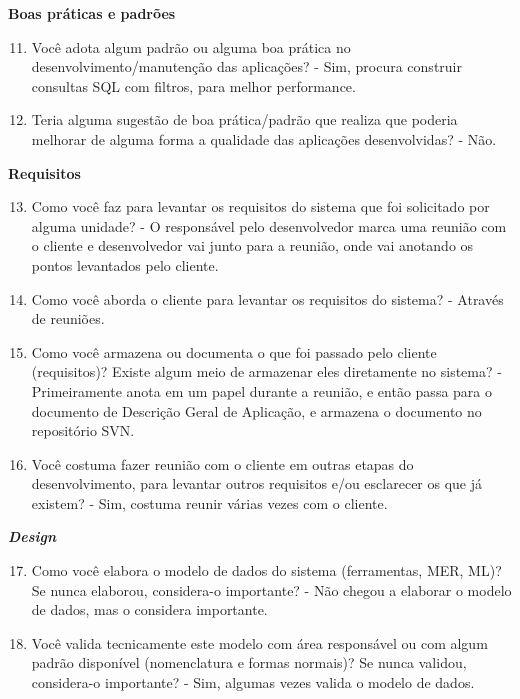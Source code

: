 \begin{anexosenv}
\textbf{Boas práticas e padrões}

\begin{enumerate}
\setcounter{enumi}{10}
\item Você adota algum padrão ou alguma boa prática no desenvolvimento/manutenção das
aplicações?\newline
- Sim, procura construir consultas SQL com filtros, para melhor performance.
\item Teria alguma sugestão de boa prática/padrão que realiza que poderia melhorar de
alguma forma a qualidade das aplicações desenvolvidas?\newline
- Não.
\end{enumerate}

\textbf{Requisitos}

\begin{enumerate}
\setcounter{enumi}{12}
\item Como você faz para levantar os requisitos do sistema que foi solicitado por alguma
unidade?\newline
- O responsável pelo desenvolvedor marca uma reunião com o cliente e desenvolvedor vai junto para a reunião, onde vai anotando os pontos levantados pelo cliente.
\item Como você aborda o cliente para levantar os requisitos do sistema?\newline
- Através de reuniões.
\item Como você armazena ou documenta o que foi passado pelo cliente (requisitos)? Existe
algum meio de armazenar eles diretamente no sistema?\newline
- Primeiramente anota em um papel durante a reunião, e então passa para o documento de Descrição Geral de Aplicação, e armazena o documento no repositório SVN.
\item Você costuma fazer reunião com o cliente em outras etapas do desenvolvimento, para
levantar outros requisitos e/ou esclarecer os que já existem?\newline
- Sim, costuma reunir várias vezes com o cliente.
\end{enumerate}

\textbf{\textit{Design}}

\begin{enumerate}
\setcounter{enumi}{16}
\item Como você elabora o modelo de dados do sistema (ferramentas, MER, ML)? Se nunca
elaborou, considera-o importante?\newline
- Não chegou a elaborar o modelo de dados, mas o considera importante.
\item Você valida tecnicamente este modelo com área responsável ou com algum padrão
disponível (nomenclatura e formas normais)? Se nunca validou, considera-o importante?\newline
- Sim, algumas vezes valida o modelo de dados.
\end{enumerate}


\end{anexosenv}
